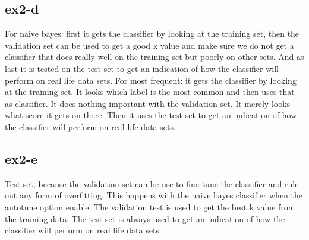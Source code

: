 \subsection{ex2-d}
For naive bayes: first it gets the classifier by looking at the training set, then the 
validation set can be used to get a good k value and make sure we do not
get a classifier that does really well on the training set but poorly on other sets.
And as last it is tested on the test set to get an indication of how the classifier will
perform on real life data sets.
For  most frequent: it gets the classifier by looking at the training set. It looks which label
is the most common and then uses that as classifier. It does nothing important with the validation set.
It merely looks what score it gets on there. Then it uses the test set to get an indication 
of how the classifier will perform on real life data sets.


\subsection{ex2-e}
Test set, because the validation set can be use to fine tune the classifier and rule out any
form of overfitting. This happens with the naive bayes classifier when the autotune option enable. 
The validation test is used to get the best k value from the training data.
The test set is always used to get an indication of how the classifier will perform on real
life data sets.












